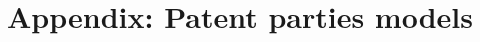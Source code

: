 \documentclass[../main.tex]{subfiles}
\begin{document}
\section{Appendix: Patent parties models}
\label{sec:appendixb}
\end{document}
